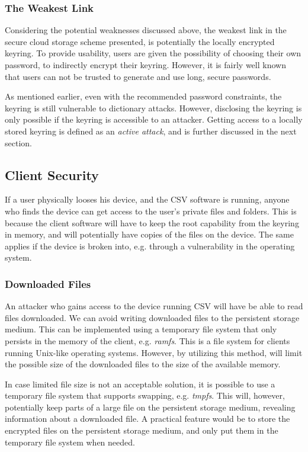 \documentclass[pdftex,english,10pt,b5paper,twoside]{book}
\begin{document}
\subsubsection{The Weakest Link}

Considering the potential weaknesses discussed above, the weakest link in the
secure cloud storage scheme presented, is potentially the locally encrypted
keyring. To provide usability, users are given the possibility of choosing
their own password, to indirectly encrypt their keyring. However, it is fairly
well known that users can not be trusted to generate and use long, secure
passwords.

As mentioned earlier, even with the recommended password constraints, the
keyring is still vulnerable to dictionary attacks. However, disclosing the
keyring is only possible if the keyring is accessible to an attacker. Getting
access to a locally stored keyring is defined as an \emph{active attack}, and is
further discussed in the next section.

\subsection{Client Security}

If a user physically looses his device, and the \ac{CSV} software is running,
anyone who finds the device can get access to the user's private files and
folders. This is because the client software will have to keep the root
capability from the keyring in memory, and will potentially have copies of the
files on the device. The same applies if the device is broken into, e.g.
through a vulnerability in the operating system.

\subsubsection{Downloaded Files} 

An attacker who gains access to the device running \ac{CSV} will have be able
to read files downloaded. We can avoid writing downloaded files to the
persistent storage medium. This can be implemented using a temporary file
system that only persists in the memory of the client, e.g. \emph{ramfs}. This
is a file system for clients running Unix-like operating systems.  However, by
utilizing this method, will limit the possible size of the downloaded files to
the size of the available memory. 

In case limited file size is not an acceptable solution, it is possible to use
a temporary file system that supports swapping, e.g. \emph{tmpfs}.  This will,
however, potentially keep parts of a large file on the persistent storage
medium, revealing information about a downloaded file. A practical feature
would be to store the encrypted files on the persistent storage medium, and
only put them in the temporary file system when needed. 
\end{document}
